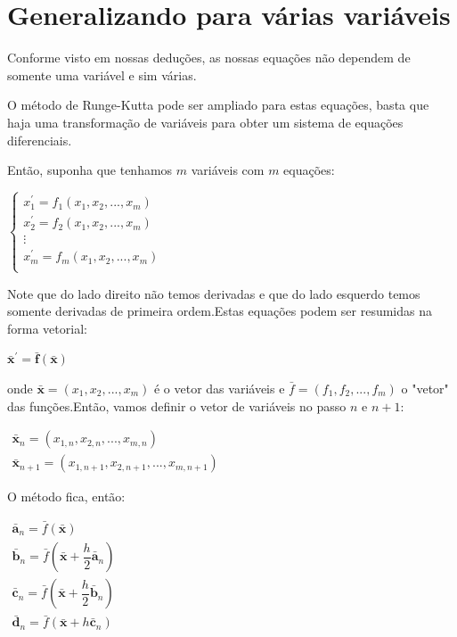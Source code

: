 \documentclass[13pt,a4paper]{report}
\begin{document}
\section*{Generalizando para várias variáveis}

Conforme visto em nossas deduções, as nossas equações não dependem de somente uma variável e sim várias.

O método de Runge-Kutta pode ser ampliado para estas equações, basta que haja uma transformação de variáveis para obter um sistema de equações diferenciais.

Então, suponha que tenhamos $m$ variáveis com $m$ equações:

\begin{center}
$
\left \{
\begin{array}{c}
x_{1}^{'} = f_{1}\left(x_{1},x_{2},...,x_{m} \right) \\
x_{2}^{'} = f_{2}\left(x_{1},x_{2},...,x_{m} \right) \\
\vdots \\
x_{m}^{'} = f_{m}\left(x_{1},x_{2},...,x_{m} \right) \\
\end{array}
\right.
$
\end{center}
Note que do lado direito não temos derivadas e que do lado esquerdo temos somente derivadas de primeira ordem.Estas equações podem ser resumidas na forma vetorial:
\begin{center}
$
\bar{\textbf{x}}^{'} = \bar{\textbf{f}}\left(\bar{\textbf{x}}\right)
$
\end{center}
onde $\bar{\textbf{x}} = \left(x_{1},x_{2},...,x_{m}\right)$ é o vetor das variáveis e
$ \bar{f} = \left(f_{1},f_{2},...,f_{m}\right) $ o "vetor" das funções.Então, vamos definir
o vetor de variáveis no passo $n$ e $n+1$:
\begin{center}
$
\begin{array}{c}
\bar{\textbf{x}}_{n} = \left(x_{1,n},x_{2,n},...,x_{m,n}\right) \\
\bar{\textbf{x}}_{n + 1} = \left(x_{1,n + 1},x_{2,n + 1},...,x_{m,n + 1}\right) 
\end{array}
$
\end{center}
O método fica, então:
\begin{center}
$
\begin{array}{c}
\bar{\textbf{a}}_{n}  = \bar{f}\left(\bar{\textbf{x}}\right) \\[3mm]
\bar{\textbf{b}}_{n}  = \bar{f}\left(\bar{\textbf{x}} + \dfrac{h}{2}\bar{\textbf{a}}_{n} \right) \\[3mm]
\bar{\textbf{c}}_{n}  = \bar{f}\left(\bar{\textbf{x}} + \dfrac{h}{2}\bar{\textbf{b}}_{n} \right) \\[3mm]
\bar{\textbf{d}}_{n}  = \bar{f}\left(\bar{\textbf{x}} + h\bar{\textbf{c}}_{n} \right)
\end{array}
$
\end{center}
\end{document}
